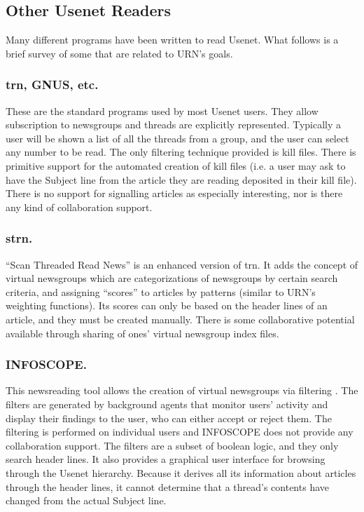 \subsection{Other Usenet Readers}

Many different programs have been written to read Usenet. What follows is a
brief survey of some that are related to URN's goals.

\subsubsection{trn, GNUS, etc.}

These are the standard programs used by most Usenet users. They allow
subscription to newsgroups and threads are explicitly represented. Typically a
user will be shown a list of all the threads from a group, and the user can
select any number to be read. The only filtering technique provided is kill
files. There is primitive support for the automated creation of kill files
(i.e. a user may ask to have the Subject line from the article they are reading
deposited in their kill file). There is no support for signalling articles as
especially interesting, nor is there any kind of collaboration support.

\subsubsection{strn.}

``Scan Threaded Read News'' is an enhanced version of trn. It adds the
concept of virtual newsgroups which are categorizations of newsgroups by
certain search criteria, and assigning ``scores'' to articles by patterns
(similar to URN's weighting functions). Its scores can only be based on
the header lines of an article, and they must be created manually. There is
some collaborative potential available through sharing of ones' virtual
newsgroup index files.

\subsubsection{INFOSCOPE.}

This newsreading tool allows the creation of virtual newsgroups
via filtering \cite{chi-infoscope-91,cacm-infoscope-92}. The filters are
generated by background agents that monitor users' activity and display their
findings to the user, who can either accept or reject them.  The filtering is
performed on individual users and INFOSCOPE does not provide any collaboration
support.  The filters are a subset of boolean logic, and they only search
header lines. It also provides a graphical user interface for browsing through
the Usenet hierarchy. Because it derives all its information about articles
through the header lines, it cannot determine that a thread's contents have
changed from the actual Subject line.

